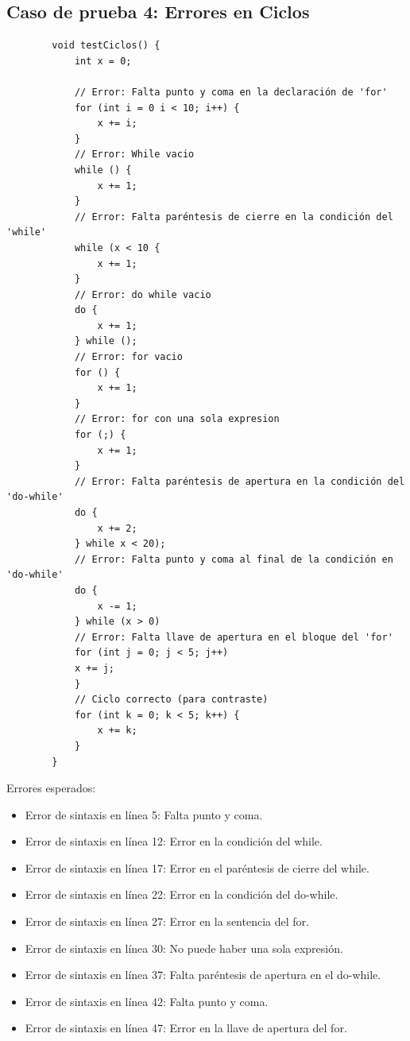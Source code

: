 \documentclass[a4paper,12pt]{article}
\begin{document}
\newpage

\subsection*{Caso de prueba 4: Errores en Ciclos}
\begin{flushleft}
	\begin{verbatim}
		void testCiclos() {
			int x = 0;
			
			// Error: Falta punto y coma en la declaración de 'for'
			for (int i = 0 i < 10; i++) { 
				x += i;
			}
			// Error: While vacio
			while () {
				x += 1;
			}
			// Error: Falta paréntesis de cierre en la condición del 'while'
			while (x < 10 {
				x += 1;
			}
			// Error: do while vacio
			do {
				x += 1;
			} while ();
			// Error: for vacio
			for () {
				x += 1;
			}
			// Error: for con una sola expresion
			for (;) {
				x += 1;
			}
			// Error: Falta paréntesis de apertura en la condición del 'do-while'
			do {
				x += 2;
			} while x < 20);
			// Error: Falta punto y coma al final de la condición en 'do-while'
			do {
				x -= 1;
			} while (x > 0)
			// Error: Falta llave de apertura en el bloque del 'for'
			for (int j = 0; j < 5; j++) 
			x += j;
			}
			// Ciclo correcto (para contraste)
			for (int k = 0; k < 5; k++) {
				x += k;
			}
		}
	\end{verbatim}
	Errores esperados:
	\begin{itemize} 
		\item Error de sintaxis en línea 5: Falta punto y coma.
		\item Error de sintaxis en línea 12: Error en la condición del while.
		\item Error de sintaxis en línea 17: Error en el paréntesis de cierre del while.
		\item Error de sintaxis en línea 22: Error en la condición del do-while.
		\item Error de sintaxis en línea 27: Error en la sentencia del for.
		\item Error de sintaxis en línea 30: No puede haber una sola expresión.
		\item Error de sintaxis en línea 37: Falta paréntesis de apertura en el do-while.
		\item Error de sintaxis en línea 42: Falta punto y coma.
		\item Error de sintaxis en línea 47: Error en la llave de apertura del for.
	\end{itemize}

\end{flushleft}
\end{document}
